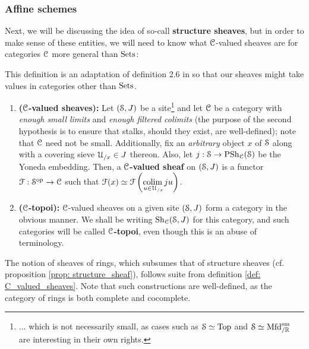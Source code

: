         \subsubsection{Affine schemes}
            Next, we will be discussing the idea of so-call \textbf{structure sheaves}, but in order to make sense of these entities, we will need to know what $\C$-valued sheaves are for categories $\C$ more general than $\Sets$:
            \begin{definition} \label{def: C_valued_sheaves}
                This definition is an adaptation of definition 2.6 in \cite{nlab:sheaf} so that our sheaves might take values in categories other than $\Sets$.
                \begin{enumerate}
                    \item \textbf{($\C$-valued sheaves):} Let $(\S, J)$ be a site\footnote{... which is not necessarily small, as cases such as $\S \cong \Top$ and $\S \cong \Mfd^{\smooth}_{/\R}$ are interesting in their own rights.} and let $\C$ be a category with \textit{enough small limits} and \textit{enough filtered colimits} (the purpose of the second hypothesis is to ensure that stalks, should they exist, are well-defined); note that $\C$ need not be small. Additionally, fix an \textit{arbitrary} object $x$ of $\S$ along with a covering sieve $\calU_{/x} \in J$ thereon. Also, let $j: \S \to \Psh_{\C}(\S)$ be the Yoneda embedding. Then, a \textbf{$\C$-valued sheaf} on $(\S, J)$ is a functor $\calF: \S^{\op} \to \C$ such that $\calF(x) \cong \calF\left( \underset{u \in \calU_{/x}}{\colim} ju \right)$.
                    \item \textbf{($\C$-topoi):} $\C$-valued sheaves on a given site $(\S, J)$ form a category in the obvious manner. We shall be writing $\Sh_{\C}(\S, J)$ for this category, and such categories will be called \textbf{$\C$-topoi}, even though this is an abuse of terminology.
                \end{enumerate}
            \end{definition}
            \begin{example}
                The notion of sheaves of rings, which subsumes that of structure sheaves (cf. proposition \ref{prop: structure_sheaf}), follows suite from definition \ref{def: C_valued_sheaves}. Note that such constructions are well-defined, as the category of rings is both complete and cocomplete.
            \end{example}
            
